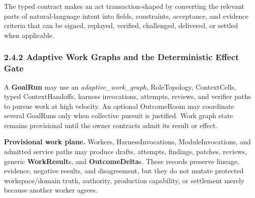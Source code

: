 \documentclass[
  11pt,
]{article}
\begin{document}
The typed contract makes an act transaction-shaped by converting the
relevant parts of natural-language intent into fields, constraints,
acceptance, and evidence criteria that can be signed, replayed, verified,
challenged, delivered, or settled when applicable.

\hypertarget{the-adversarial-hierarchy-adaptive-work-graphs-deterministic-gate}{%
\subsubsection{2.4.2 Adaptive Work Graphs and the Deterministic Effect
Gate}\label{the-adversarial-hierarchy-adaptive-work-graphs-deterministic-gate}}

A \textbf{GoalRun} may use an \emph{adaptive\_work\_graph}, RoleTopology,
ContextCells, typed ContextHandoffs, harness invocations, attempts, reviews, and
verifier paths to pursue work at high velocity. An optional OutcomeRoom may
coordinate several GoalRuns only when collective pursuit is justified. Work
graph state remains provisional until the owner contracts admit its result or
effect.


\begin{center}
\end{center}


\textbf{Provisional work plane.} Workers, HarnessInvocations,
ModuleInvocations, and admitted service paths may produce drafts, attempts,
findings, patches,
reviews, generic \textbf{WorkResult}s, and
\textbf{OutcomeDelta}s. These records preserve lineage, evidence, negative
results, and disagreement, but they do not mutate protected workspace/domain
truth, authority, production capability, or settlement merely because another
worker agrees.
\end{document}
